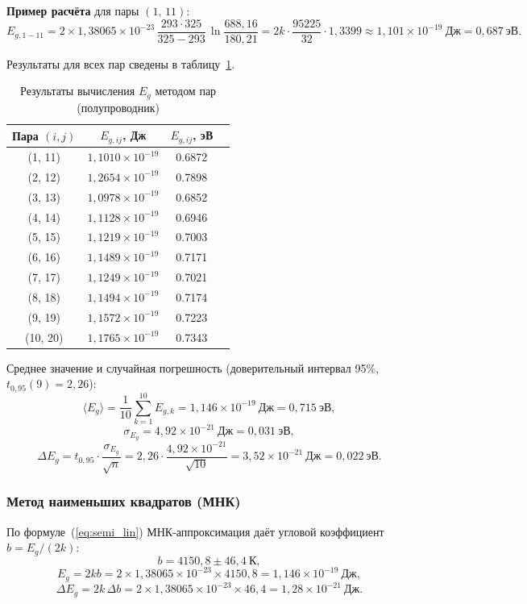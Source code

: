\documentclass[a4paper,14pt]{article}
\begin{document}
\textbf{Пример расчёта} для пары $(1,\,11)$:
\[
    E_{g,1{-}11} = 2 \times 1{,}38065\times10^{-23}\,
    \frac{293 \cdot 325}{325 - 293}\,\ln\frac{688{,}16}{180{,}21}
    = 2k \cdot \frac{95225}{32} \cdot 1{,}3399
    \approx 1{,}101\times10^{-19}\ \text{Дж} = 0{,}687\ \text{эВ}.
\]

Результаты для всех пар сведены в таблицу~\ref{tab:eg_pairs}.

\begin{table}[H]
\centering
\caption{Результаты вычисления $E_g$ методом пар (полупроводник)}
\label{tab:eg_pairs}
\begin{tabular}{|c|c|c|c|}
\hline
Пара $(i,j)$ & $E_{g,ij}$, Дж & $E_{g,ij}$, эВ \\
\hline
(1, 11)  & $1{,}1010\times10^{-19}$ & 0.6872 \\
(2, 12)  & $1{,}2654\times10^{-19}$ & 0.7898 \\
(3, 13)  & $1{,}0978\times10^{-19}$ & 0.6852 \\
(4, 14)  & $1{,}1128\times10^{-19}$ & 0.6946 \\
(5, 15)  & $1{,}1219\times10^{-19}$ & 0.7003 \\
(6, 16)  & $1{,}1489\times10^{-19}$ & 0.7171 \\
(7, 17)  & $1{,}1249\times10^{-19}$ & 0.7021 \\
(8, 18)  & $1{,}1494\times10^{-19}$ & 0.7174 \\
(9, 19)  & $1{,}1572\times10^{-19}$ & 0.7223 \\
(10, 20) & $1{,}1765\times10^{-19}$ & 0.7343 \\
\hline
\end{tabular}
\end{table}

Среднее значение и случайная погрешность (доверительный интервал 95\%, $t_{0{,}95}(9) = 2{,}26$):
\[
    \langle E_g \rangle = \frac{1}{10}\sum_{k=1}^{10} E_{g,k}
    = 1{,}146\times10^{-19}\ \text{Дж} = 0{,}715\ \text{эВ},
\]
\[
    \sigma_{E_g} = 4{,}92\times10^{-21}\ \text{Дж} = 0{,}031\ \text{эВ},
\]
\[
    \Delta E_g = t_{0{,}95}\cdot\frac{\sigma_{E_g}}{\sqrt{n}}
    = 2{,}26 \cdot \frac{4{,}92\times10^{-21}}{\sqrt{10}}
    = 3{,}52\times10^{-21}\ \text{Дж} = 0{,}022\ \text{эВ}.
\]

\subsubsection*{Метод наименьших квадратов (МНК)}

По формуле~(\ref{eq:semi_lin}) МНК-аппроксимация даёт угловой коэффициент
$b = E_g/(2k)$:
\[
    b = 4150{,}8 \pm 46{,}4\ \text{К},
\]
\[
    E_g = 2k b = 2 \times 1{,}38065\times10^{-23} \times 4150{,}8
    = 1{,}146\times10^{-19}\ \text{Дж},
\]
\[
    \Delta E_g = 2k\,\Delta b = 2 \times 1{,}38065\times10^{-23} \times 46{,}4
    = 1{,}28\times10^{-21}\ \text{Дж}.
\]
\end{document}

